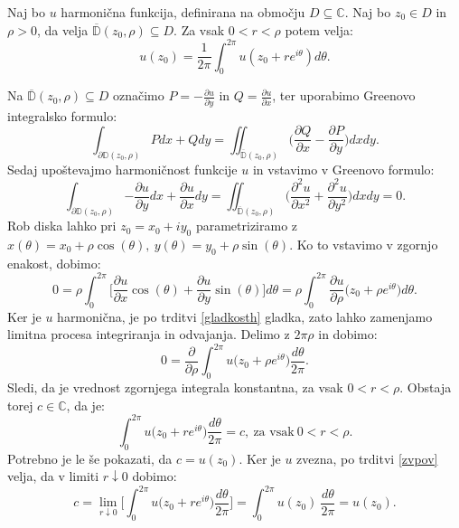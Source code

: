 \documentclass[mat1]{fmfdelo}
\newcommand{\C}{\mathbb C}
\begin{document}
    \begin{trditev}
        \label{harmonicnapovp}
        Naj bo $u$ harmonična funkcija, definirana na območju $D \subseteq \C$. Naj bo $z_0 \in D$ in $\rho > 0$, da velja $\overline{\mathbb{D}}(z_0, \rho) \subseteq D$. Za vsak $0 < r < \rho$ potem velja:
            $$
                u(z_0) = \frac{1}{2 \pi} \int_{0}^{2 \pi}{u(z_0 + r e^{i \theta}) d\theta}.
            $$
    \end{trditev}
    \begin{dokaz}
        Na $\overline{\mathbb{D}}(z_0, \rho) \subseteq D$ označimo $P = -\frac{\partial u}{\partial y}$ in $Q = \frac{\partial u}{\partial x}$, ter uporabimo Greenovo integralsko formulo:
        $$
            \int_{\partial \mathbb{D}(z_0, \rho)}{P dx + Q dy} = \iint_{\overline{\mathbb{D}}(z_0, \rho)}{\bigg(\frac{\partial Q}{\partial x} - \frac{\partial P}{\partial y}\bigg)dx dy}.
        $$ 
        Sedaj upoštevajmo harmoničnost funkcije $u$ in vstavimo v Greenovo formulo:
        $$
        \int_{\partial \mathbb{D}(z_0, \rho)}{-\frac{\partial u}{\partial y} dx + \frac{\partial u}{\partial x} dy} = \iint_{\overline{\mathbb{D}}(z_0, \rho)}{\bigg(\frac{\partial^2 u}{\partial x^2} + \frac{\partial^2 u}{\partial y^2}\bigg)dx dy} = 0. 
        $$
        Rob diska lahko pri $z_0 = x_0 + iy_0$ parametriziramo z $x(\theta) = x_0 + \rho \cos(\theta),~y(\theta) = y_0 + \rho \sin(\theta)$. Ko to vstavimo v zgornjo enakost, dobimo:
        $$
        0 = \rho \int_{0}^{2 \pi}{\bigg[\frac{\partial u}{\partial x} \cos(\theta) + \frac{\partial u}{\partial y} \sin(\theta)\bigg] d\theta} = \rho \int_{0}^{2\pi}{\frac{\partial u}{\partial \rho}\big({z_0 + \rho e^{i\theta}\big)d\theta}}.
        $$
        Ker je $u$ harmonična, je po trditvi \ref{gladkosth} gladka, zato lahko zamenjamo limitna procesa integriranja in odvajanja. Delimo z $2\pi \rho$ in dobimo:
        $$
        0 = \frac{\partial}{\partial \rho} \int_{0}^{2\pi}{u\big({z_0 + \rho e^{i\theta}\big)\frac{d\theta}{2 \pi}}}.
        $$
        Sledi, da je vrednost zgornjega integrala konstantna, za vsak $0 <r < \rho$. Obstaja torej $c \in \mathbb{C}$, da je: 
        $$
        \int_{0}^{2\pi}{u\big({z_0 + r e^{i\theta}\big)\frac{d\theta}{2 \pi}}} = c,~\text{za vsak}~ 0 < r < \rho.
        $$
        Potrebno je le še pokazati, da $c = u(z_0)$.
        Ker je $u$ zvezna, po trditvi \ref{zvpov} velja, da v limiti $r \downarrow 0$ dobimo:
        $$
        c = \lim_{r \downarrow 0}{\bigg[\int_{0}^{2\pi}{u\big({z_0 + r e^{i\theta}\big)\frac{d\theta}{2 \pi}}}\bigg]} = \int_{0}^{2\pi}{{u(z_0)~\frac{d\theta}{2 \pi}}} = u(z_0).
        $$
    \end{dokaz}
\end{document}
